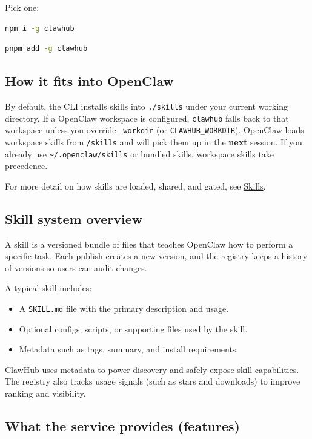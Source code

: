 Pick one:

\begin{lstlisting}[language=bash]
npm i -g clawhub
\end{lstlisting}


\begin{lstlisting}[language=bash]
pnpm add -g clawhub
\end{lstlisting}


\subsection{How it fits into OpenClaw}


By default, the CLI installs skills into \texttt{./skills} under your current working directory. If a OpenClaw workspace is configured, \texttt{clawhub} falls back to that workspace unless you override \texttt{--workdir} (or \texttt{CLAWHUB\_WORKDIR}). OpenClaw loads workspace skills from \texttt{/skills} and will pick them up in the \textbf{next} session. If you already use \texttt{\textasciitilde{}/.openclaw/skills} or bundled skills, workspace skills take precedence.

For more detail on how skills are loaded, shared, and gated, see
\href{/tools/skills}{Skills}.

\subsection{Skill system overview}


A skill is a versioned bundle of files that teaches OpenClaw how to perform a
specific task. Each publish creates a new version, and the registry keeps a
history of versions so users can audit changes.

A typical skill includes:

\begin{itemize}
  \item A \texttt{SKILL.md} file with the primary description and usage.
  \item Optional configs, scripts, or supporting files used by the skill.
  \item Metadata such as tags, summary, and install requirements.
\end{itemize}


ClawHub uses metadata to power discovery and safely expose skill capabilities.
The registry also tracks usage signals (such as stars and downloads) to improve
ranking and visibility.

\subsection{What the service provides (features)}


